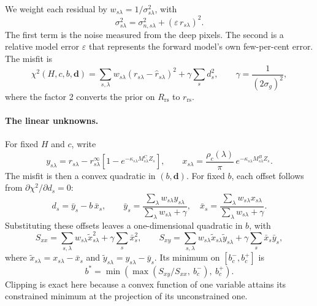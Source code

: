 \documentclass[remotesensing,article,submit,pdftex]{Definitions/mdpi}
\begin{document}
We weight each residual by $w_{s\lambda} = 1/\sigma_{s\lambda}^2$, with
\begin{equation}
\sigma_{s\lambda}^2 = \sigma_{n,s\lambda}^2 + \left(\varepsilon\, r_{s\lambda}\right)^2. \label{eq:sigma}
\end{equation}
The first term is the noise measured from the deep pixels. The second is a relative model error $\varepsilon$ that represents the forward model's own few-per-cent error. The misfit is
\begin{equation}
\chi^2(H, c, b, \mathbf{d}) = \sum_{s,\lambda} w_{s\lambda}\left(r_{s\lambda} - \hat r_{s\lambda}\right)^2 + \gamma \sum_s d_s^2, \qquad \gamma = \frac{1}{(2\sigma_g)^2},
\end{equation}
where the factor 2 converts the prior on $R_\mathrm{rs}$ to $r_\mathrm{rs}$.

\paragraph{The linear unknowns.} For fixed $H$ and $c$, write
\begin{equation}
y_{s\lambda} = r_{s\lambda} - r^\infty_{s\lambda}\left[1 - e^{-\kappa_{s\lambda} M^C_{s\lambda} Z_s}\right], \qquad x_{s\lambda} = \frac{\rho_c(\lambda)}{\pi}\,e^{-\kappa_{s\lambda} M^B_{s\lambda} Z_s}.
\end{equation}
The misfit is then a convex quadratic in $(b, \mathbf{d})$. For fixed $b$, each offset follows from $\partial\chi^2/\partial d_s = 0$:
\begin{equation}
d_s = \bar y_s - b\,\bar x_s, \qquad \bar y_s = \frac{\sum_\lambda w_{s\lambda} y_{s\lambda}}{\sum_\lambda w_{s\lambda} + \gamma}, \quad \bar x_s = \frac{\sum_\lambda w_{s\lambda} x_{s\lambda}}{\sum_\lambda w_{s\lambda} + \gamma}.
\end{equation}
Substituting these offsets leaves a one-dimensional quadratic in $b$, with
\begin{equation}
S_{xx} = \sum_{s,\lambda} w_{s\lambda}\tilde x_{s\lambda}^2 + \gamma\sum_s \bar x_s^2, \qquad S_{xy} = \sum_{s,\lambda} w_{s\lambda}\tilde x_{s\lambda}\tilde y_{s\lambda} + \gamma\sum_s \bar x_s \bar y_s,
\end{equation}
where $\tilde x_{s\lambda} = x_{s\lambda} - \bar x_s$ and $\tilde y_{s\lambda} = y_{s\lambda} - \bar y_s$. Its minimum on $[b_c^-, b_c^+]$ is
\begin{equation}
b^\ast = \min\left(\max\left(S_{xy}/S_{xx},\ b_c^-\right),\ b_c^+\right).
\end{equation}
Clipping is exact here because a convex function of one variable attains its constrained minimum at the projection of its unconstrained one.
\end{document}
